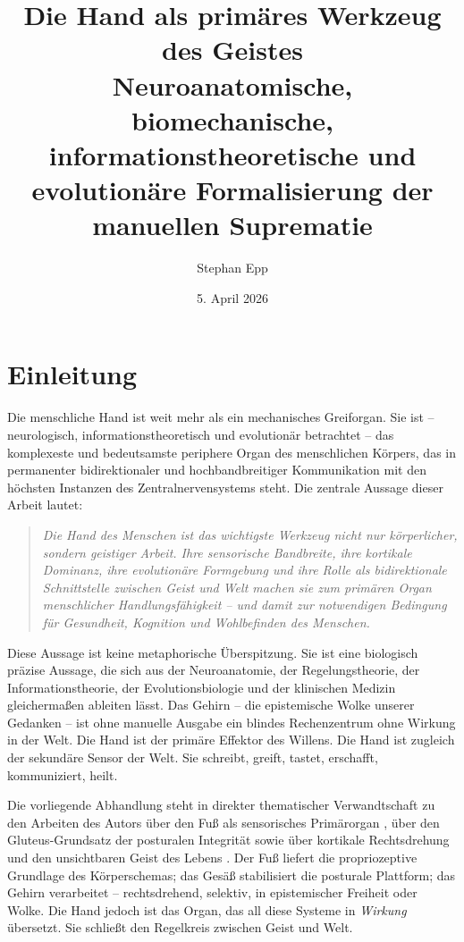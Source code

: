 ﻿\documentclass[12pt,a4paper]{report}
\title{\textbf{Die Hand als primäres Werkzeug des Geistes}\\[0.5em]
\large Neuroanatomische, biomechanische, informationstheoretische und\\
evolutionäre Formalisierung der manuellen Suprematie}
\author{Stephan Epp}
\date{5. April 2026}
\theoremstyle{plain}
\theoremstyle{definition}
\theoremstyle{remark}
\begin{document}
\maketitle
\tableofcontents
\newpage
{}

\chapter{Einleitung}

Die menschliche Hand ist weit mehr als ein mechanisches Greiforgan.
Sie ist -- neurologisch, informationstheoretisch und evolutionär betrachtet --
das komplexeste und bedeutsamste periphere Organ des menschlichen Körpers,
das in permanenter bidirektionaler und hochbandbreitiger Kommunikation
mit den höchsten Instanzen des Zentralnervensystems steht. Die zentrale Aussage
dieser Arbeit lautet:

\begin{quote}
\textit{Die Hand des Menschen ist das wichtigste Werkzeug nicht nur
körperlicher, sondern geistiger Arbeit. Ihre sensorische Bandbreite,
ihre kortikale Dominanz, ihre evolutionäre Formgebung und ihre Rolle
als bidirektionale Schnittstelle zwischen Geist und Welt machen sie zum
primären Organ menschlicher Handlungsfähigkeit -- und damit zur
notwendigen Bedingung für Gesundheit, Kognition und Wohlbefinden des
Menschen.}
\end{quote}

Diese Aussage ist keine metaphorische Überspitzung. Sie ist eine biologisch
präzise Aussage, die sich aus der Neuroanatomie, der Regelungstheorie,
der Informationstheorie, der Evolutionsbiologie und der klinischen Medizin
gleichermaßen ableiten lässt. Das Gehirn -- die epistemische Wolke unserer
Gedanken \cite{epp2026brn} -- ist ohne manuelle Ausgabe ein blindes
Rechenzentrum ohne Wirkung in der Welt. Die Hand ist der primäre Effektor
des Willens. Die Hand ist zugleich der sekundäre Sensor der Welt.
Sie schreibt, greift, tastet, erschafft, kommuniziert, heilt.

Die vorliegende Abhandlung steht in direkter thematischer Verwandtschaft
zu den Arbeiten des Autors über den Fuß als sensorisches Primärorgan
\cite{epp2026feed}, über den Gluteus-Grundsatz der posturalen Integrität
\cite{epp2026butt} sowie über kortikale Rechtsdrehung und den unsichtbaren
Geist des Lebens \cite{epp2026brn}. Der Fuß liefert die propriozeptive
Grundlage des Körperschemas; das Gesäß stabilisiert die posturale Plattform;
das Gehirn verarbeitet -- rechtsdrehend, selektiv, in epistemischer Freiheit
oder Wolke. Die Hand jedoch ist das Organ, das all diese Systeme in
\emph{Wirkung} übersetzt. Sie schließt den Regelkreis zwischen Geist und Welt.
\end{document}
